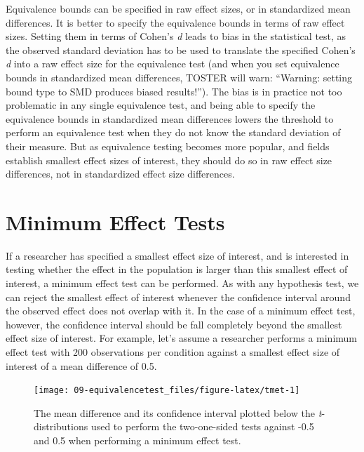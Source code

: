 \documentclass[
  oneside]{krantz}
\begin{document}
Equivalence bounds can be specified in raw effect sizes, or in standardized mean differences. It is better to specify the equivalence bounds in terms of raw effect sizes. Setting them in terms of Cohen's \emph{d} leads to bias in the statistical test, as the observed standard deviation has to be used to translate the specified Cohen's \emph{d} into a raw effect size for the equivalence test (and when you set equivalence bounds in standardized mean differences, TOSTER will warn: ``Warning: setting bound type to SMD produces biased results!''). The bias is in practice not too problematic in any single equivalence test, and being able to specify the equivalence bounds in standardized mean differences lowers the threshold to perform an equivalence test when they do not know the standard deviation of their measure. But as equivalence testing becomes more popular, and fields establish smallest effect sizes of interest, they should do so in raw effect size differences, not in standardized effect size differences.

\hypertarget{MET}{%
\section{Minimum Effect Tests}\label{MET}}

If a researcher has specified a smallest effect size of interest, and is interested in testing whether the effect in the population is larger than this smallest effect of interest, a minimum effect test can be performed. As with any hypothesis test, we can reject the smallest effect of interest whenever the confidence interval around the observed effect does not overlap with it. In the case of a minimum effect test, however, the confidence interval should be fall completely beyond the smallest effect size of interest. For example, let's assume a researcher performs a minimum effect test with 200 observations per condition against a smallest effect size of interest of a mean difference of 0.5.



\begin{figure}

{\centering \texttt{[image: 09-equivalencetest\_files/figure-latex/tmet-1]} 

}

\caption{The mean difference and its confidence interval plotted below the \emph{t}-distributions used to perform the two-one-sided tests against -0.5 and 0.5 when performing a minimum effect test.}\label{fig:tmet}
\end{figure}
\end{document}
